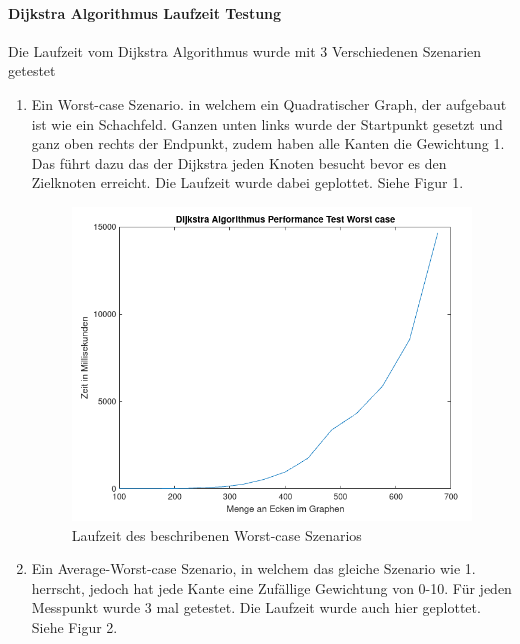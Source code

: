 \documentclass[utf8]{article}
\begin{document}
\paragraph{Dijkstra Algorithmus Laufzeit Testung}
Die Laufzeit vom Dijkstra Algorithmus wurde mit 3 Verschiedenen Szenarien getestet
\begin{enumerate}
  \item Ein Worst-case Szenario. in welchem ein Quadratischer Graph, der aufgebaut ist
  wie ein Schachfeld. Ganzen unten links wurde der Startpunkt gesetzt und
  ganz oben rechts der Endpunkt, zudem haben alle Kanten die Gewichtung 1.
  Das führt dazu das der Dijkstra jeden Knoten besucht bevor es den Zielknoten
  erreicht. Die Laufzeit wurde dabei geplottet. Siehe Figur 1.

  \begin{figure}[H]
    \centering
    \includegraphics[width=1\textwidth]{Images/Worstcase.png}
    \caption[]{Laufzeit des beschribenen Worst-case Szenarios}
  \end{figure}

  \item Ein Average-Worst-case Szenario, in welchem das gleiche Szenario wie
  1. herrscht, jedoch hat jede Kante eine Zufällige Gewichtung von 0-10.
  Für jeden Messpunkt wurde 3 mal getestet. Die Laufzeit wurde auch hier geplottet.
  Siehe Figur 2.


\end{enumerate}
\end{document}
